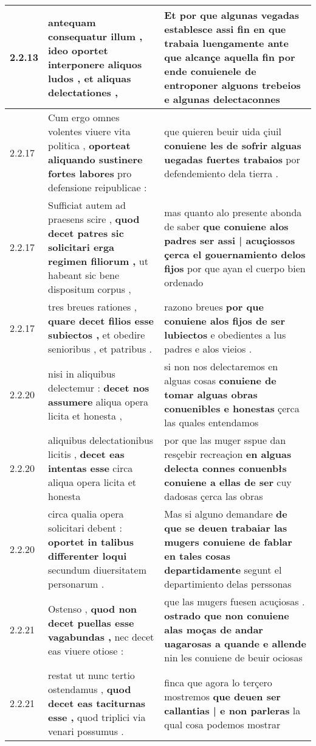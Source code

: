 \begin{tabular}{|p{1cm}|p{6.5cm}|p{6.5cm}|}
2.2.13 & antequam consequatur illum , \textbf{ ideo oportet interponere aliquos ludos , } et aliquas delectationes , & Et por que algunas vegadas establesce assi fin en que trabaia luengamente ante que alcançe aquella fin \textbf{ por ende conuienele de entroponer alguons trebeios } e algunas delectaconnes \\\hline
2.2.17 & Cum ergo omnes volentes viuere vita politica , \textbf{ oporteat aliquando sustinere fortes labores } pro defensione reipublicae : & que quieren beuir uida çiuil \textbf{ conuiene les de sofrir alguas uegadas fuertes trabaios } por defendemiento dela tierra . \\\hline
2.2.17 & Sufficiat autem ad praesens scire , \textbf{ quod decet patres sic solicitari erga regimen filiorum , } ut habeant sic bene dispositum corpus , & mas quanto alo presente abonda de saber \textbf{ que conuiene alos padres ser assi | acuçiossos çerca el gouernamiento delos fijos } por que ayan el cuerpo bien ordenado \\\hline
2.2.17 & tres breues rationes , \textbf{ quare decet filios esse subiectos , } et obedire senioribus , et patribus . & razono breues \textbf{ por que conuiene alos fijos de ser lubiectos } e obedientes a lus padres e alos vieios . \\\hline
2.2.20 & nisi in aliquibus delectemur : \textbf{ decet nos assumere } aliqua opera licita et honesta , & si non nos delectaremos en alguas cosas \textbf{ conuiene de tomar alguas obras conuenibles e honestas } çerca las quales entendamos \\\hline
2.2.20 & aliquibus delectationibus licitis , \textbf{ decet eas intentas esse } circa aliqua opera licita et honesta & por que las muger sspue dan resçebir recreaçion \textbf{ en alguas delecta connes conuenbłs conuiene a ellas de ser } cuy dadosas çerca las obras \\\hline
2.2.20 & circa qualia opera solicitari debent : \textbf{ oportet in talibus differenter loqui } secundum diuersitatem personarum . & Mas si alguno demandare \textbf{ de que se deuen trabaiar las mugers conuiene de fablar en tales cosas departidamente } segunt el departimiento delas perssonas \\\hline
2.2.21 & Ostenso , \textbf{ quod non decet puellas esse vagabundas , } nec decet eas viuere otiose : & que las mugers fuesen acuçiosas . \textbf{ ostrado que non conuiene alas moças de andar uagarosas a quande e allende } nin les conuiene de beuir ociosas \\\hline
2.2.21 & restat ut nunc tertio ostendamus , \textbf{ quod decet eas taciturnas esse , } quod triplici via venari possumus . & finca que agora lo terçero mostremos \textbf{ que deuen ser callantias | e non parleras } la qual cosa podemos mostrar \\\hline

\end{tabular}

